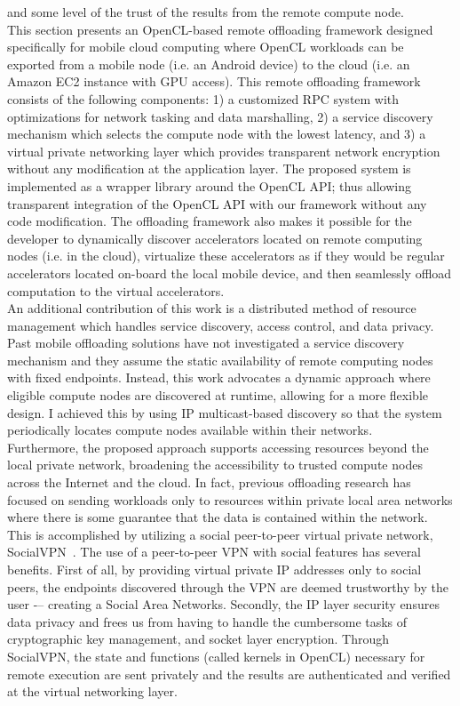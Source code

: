 and some level of the trust of the results from the remote compute node.\\
%
This section presents an OpenCL-based remote offloading framework designed
specifically for mobile cloud computing where OpenCL workloads can be exported
from a mobile node (i.e. an Android device) to the cloud (i.e.
an Amazon EC2 instance with GPU access).
%
This remote offloading framework consists of the following components:
1) a customized RPC system with optimizations for network tasking and
data marshalling, 2) a service discovery mechanism which selects the 
compute node with the lowest latency, and 3) a virtual private networking 
layer which provides transparent network encryption without any modification 
at the application layer.
%
The proposed system is implemented as a wrapper library around the OpenCL API; thus
allowing transparent integration of the OpenCL API with our framework 
without any code modification.
%
The offloading framework also makes it possible for the developer to 
dynamically discover accelerators located on remote computing nodes 
(i.e. in the cloud), virtualize these accelerators as if they would be
regular accelerators located on-board the local mobile device, and then
seamlessly offload computation to the virtual accelerators.\\
%
An additional contribution of this work is a distributed method of resource management 
which handles service discovery, access control, and data privacy.
%
Past mobile offloading solutions have not investigated a service discovery 
mechanism and they assume the static availability of remote computing nodes 
with fixed endpoints.
%
Instead, this work advocates a dynamic approach where eligible compute nodes are 
discovered at runtime, allowing for a more flexible design. 
%
I achieved this by using IP multicast-based discovery so that the
system periodically locates compute nodes available within their
networks.\\
%
Furthermore, the proposed approach supports accessing resources beyond the local
private network, broadening the accessibility to trusted compute nodes
across the Internet and the cloud.
%
In fact, previous offloading research has focused on sending workloads only to 
resources within private local area networks where there is some guarantee 
that the data is contained within the network.
%
This is accomplished by utilizing a social peer-to-peer virtual 
private network, SocialVPN~\cite{socialvpn}.
%
The use of a peer-to-peer VPN with social features has several benefits.
%
First of all, by providing virtual private IP addresses only to social peers, 
the endpoints discovered through the VPN are deemed trustworthy by the user -– 
creating a Social Area Networks.
%
Secondly, the IP layer security ensures data privacy and frees us from 
having to handle the cumbersome tasks of cryptographic key management, and 
socket layer encryption.
%
Through SocialVPN, the state and functions (called kernels in OpenCL) 
necessary for remote execution are sent privately and the results are 
authenticated and verified at the virtual networking layer.\\
%

